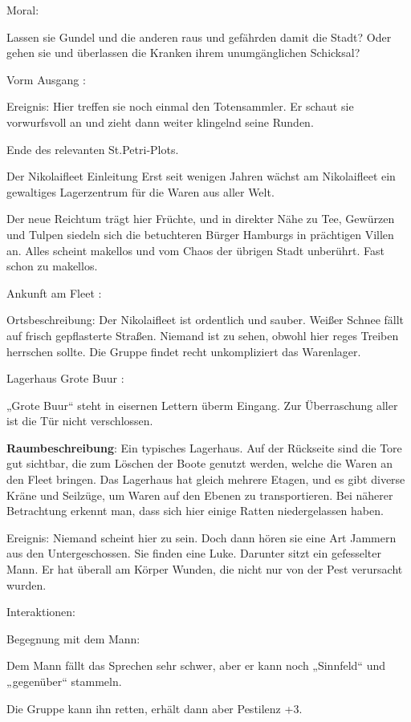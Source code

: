 Moral:

Lassen sie Gundel und die anderen raus und gefährden damit die Stadt? Oder gehen sie und überlassen die Kranken ihrem unumgänglichen Schicksal?

Vorm Ausgang
:

Ereignis: Hier treffen sie noch einmal den Totensammler. Er schaut sie vorwurfsvoll an und zieht dann weiter klingelnd seine Runden.


Ende des relevanten St.Petri-Plots.

Der Nikolaifleet
Einleitung
Erst seit wenigen Jahren wächst am Nikolaifleet ein gewaltiges Lagerzentrum für die Waren aus aller Welt.

Der neue Reichtum trägt hier Früchte, und in direkter Nähe zu Tee, Gewürzen und Tulpen siedeln sich die betuchteren Bürger Hamburgs in prächtigen Villen an. Alles scheint makellos und vom Chaos der übrigen Stadt unberührt. Fast schon zu makellos.

Ankunft am Fleet
:

Ortsbeschreibung: Der Nikolaifleet ist ordentlich und sauber. Weißer Schnee fällt auf frisch gepflasterte Straßen. Niemand ist zu sehen, obwohl hier reges Treiben herrschen sollte. Die Gruppe findet recht unkompliziert das Warenlager.


Lagerhaus Grote Buur
:

„Grote Buur“ steht in eisernen Lettern überm Eingang. Zur Überraschung aller ist die Tür nicht verschlossen.

\textbf{Raumbeschreibung}: Ein typisches Lagerhaus. Auf der Rückseite sind die Tore gut sichtbar, die zum Löschen der Boote genutzt werden, welche die Waren an den Fleet bringen. Das Lagerhaus hat gleich mehrere Etagen, und es gibt diverse Kräne und Seilzüge, um Waren auf den Ebenen zu transportieren. Bei näherer Betrachtung erkennt man, dass sich hier einige Ratten niedergelassen haben.

Ereignis: Niemand scheint hier zu sein. Doch dann hören sie eine Art Jammern aus den Untergeschossen. Sie finden eine Luke. Darunter sitzt ein gefesselter Mann. Er hat überall am Körper Wunden, die nicht nur von der Pest verursacht wurden.

Interaktionen:

Begegnung mit dem Mann:

Dem Mann fällt das Sprechen sehr schwer, aber er kann noch „Sinnfeld“ und „gegenüber“ stammeln.

Die Gruppe kann ihn retten, erhält dann aber Pestilenz +3.

